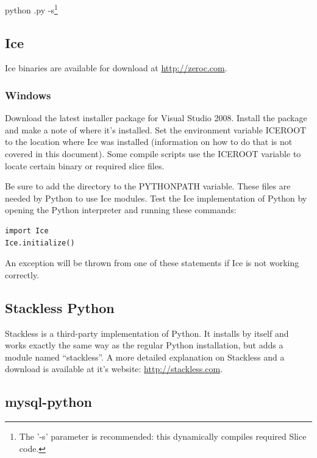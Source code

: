 \begin{commands}
python \MainServer.py -s\footnote{The '-s' parameter is recommended: this dynamically compiles required Slice code.}
\end{commands}

\subsection{Ice}

Ice binaries are available for download at \url{http://zeroc.com}.

\subsubsection*{Windows}

Download the latest installer package for Visual Studio 2008. Install the package and make a note of where it's installed. Set the environment variable ICEROOT to the location where Ice was installed (information on how to do that is not covered in this document). Some compile scripts use the ICEROOT variable to locate certain binary or required slice files.

Be sure to add the  directory to the PYTHONPATH variable. These files are needed by Python to use Ice modules. Test the Ice implementation of Python by opening the Python interpreter and running these commands:

\begin{lstlisting}
import Ice
Ice.initialize()
\end{lstlisting}

An exception will be thrown from one of these statements if Ice is not working correctly.

\subsection{Stackless Python}

Stackless is a third-party implementation of Python. It installs by itself and works exactly the same way as the regular Python installation, but adds a module named ``stackless''. A more detailed explanation on Stackless and a download is available at it's website: \url{http://stackless.com}.

\subsection{mysql-python}

